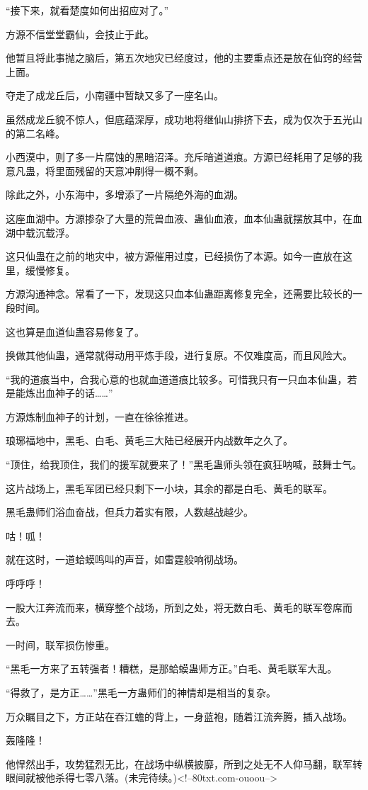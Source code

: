 \begin{this_body}
“接下来，就看楚度如何出招应对了。”

方源不信堂堂霸仙，会技止于此。

他暂且将此事抛之脑后，第五次地灾已经度过，他的主要重点还是放在仙窍的经营上面。

夺走了成龙丘后，小南疆中暂缺又多了一座名山。

虽然成龙丘貌不惊人，但底蕴深厚，成功地将继仙山排挤下去，成为仅次于五光山的第二名峰。

小西漠中，则了多一片腐蚀的黑暗沼泽。充斥暗道道痕。方源已经耗用了足够的我意凡蛊，将里面残留的天意冲刷得一概不剩。

除此之外，小东海中，多增添了一片隔绝外海的血湖。

这座血湖中。方源掺杂了大量的荒兽血液、蛊仙血液，血本仙蛊就摆放其中，在血湖中载沉载浮。

这只仙蛊在之前的地灾中，被方源催用过度，已经损伤了本源。如今一直放在这里，缓慢修复。

方源沟通神念。常看了一下，发现这只血本仙蛊距离修复完全，还需要比较长的一段时间。

这也算是血道仙蛊容易修复了。

换做其他仙蛊，通常就得动用平炼手段，进行复原。不仅难度高，而且风险大。

“我的道痕当中，合我心意的也就血道道痕比较多。可惜我只有一只血本仙蛊，若是能炼出血神子的话……”

方源炼制血神子的计划，一直在徐徐推进。

琅琊福地中，黑毛、白毛、黄毛三大陆已经展开内战数年之久了。

“顶住，给我顶住，我们的援军就要来了！”黑毛蛊师头领在疯狂呐喊，鼓舞士气。

这片战场上，黑毛军团已经只剩下一小块，其余的都是白毛、黄毛的联军。

黑毛蛊师们浴血奋战，但兵力着实有限，人数越战越少。

咕！呱！

就在这时，一道蛤蟆鸣叫的声音，如雷霆般响彻战场。

呼呼呼！

一股大江奔流而来，横穿整个战场，所到之处，将无数白毛、黄毛的联军卷席而去。

一时间，联军损伤惨重。

“黑毛一方来了五转强者！糟糕，是那蛤蟆蛊师方正。”白毛、黄毛联军大乱。

“得救了，是方正……”黑毛一方蛊师们的神情却是相当的复杂。

万众瞩目之下，方正站在吞江蟾的背上，一身蓝袍，随着江流奔腾，插入战场。

轰隆隆！

他悍然出手，攻势猛烈无比，在战场中纵横披靡，所到之处无不人仰马翻，联军转眼间就被他杀得七零八落。(未完待续。)<!--80txt.com-ouoou-->

\end{this_body}

